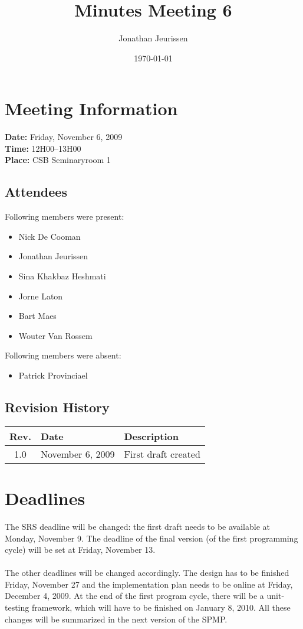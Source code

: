 \documentclass[a4paper, 12pt]{article}
\begin{document}
\title{Minutes Meeting 6}
\author{Jonathan Jeurissen}
\date{\today}

\maketitle	
	\section{Meeting Information}
		\textbf{Date:} Friday, November 6, 2009\\
		\textbf{Time:} 12H00--13H00\\
		\textbf{Place:} CSB Seminaryroom 1\\
		\subsection{Attendees}
Following members were present:
			\begin{itemize}
				\item Nick De Cooman
				\item Jonathan Jeurissen
				\item Sina Khakbaz Heshmati
				\item Jorne Laton
				\item Bart Maes
				\item Wouter Van Rossem
			\end{itemize}
Following members were absent:
			\begin{itemize}
				\item Patrick Provinciael
			\end{itemize}
			
		\subsection{Revision History}
			\begin{tabular}{c | l | l }
				\textbf{Rev.} & \textbf{Date} & \textbf{Description} \\
				\hline
				1.0 & November 6, 2009 & First draft created \\
			\end{tabular}		

	\section{Deadlines}
The SRS deadline will be changed: the first draft needs to be available at Monday, November 9. The deadline of the final version (of the first programming cycle) will be set at Friday, November 13.\\ \\ 
The other deadlines will be changed accordingly.
The design has to be finished Friday, November 27 and the implementation plan needs to be online at Friday, December 4, 2009. At the end of the first program cycle, there will be a unit-testing framework, which will have to be finished on January 8, 2010. All these changes will be summarized in the next version of the SPMP.\\
\end{document}
